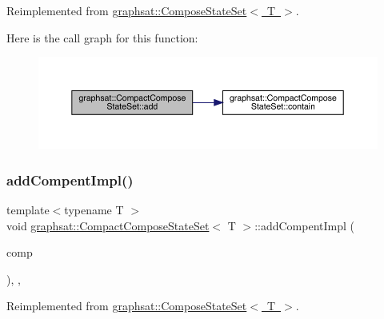 Reimplemented from \mbox{\hyperlink{classgraphsat_1_1_compose_state_set_a0f359257087c8ae10bf25881f9448395}{graphsat\+::\+Compose\+State\+Set$<$ T $>$}}.

Here is the call graph for this function\+:\nopagebreak
\begin{figure}[H]
\begin{center}
\leavevmode
\includegraphics[width=350pt]{classgraphsat_1_1_compact_compose_state_set_ad728351fbf1e81740088147289ef3884_cgraph}
\end{center}
\end{figure}
\mbox{\label{classgraphsat_1_1_compact_compose_state_set_a11bd85b646593e15141f597abbe301da}} 
\subsubsection{\texorpdfstring{addCompentImpl()}{addCompentImpl()}}
{\footnotesize\ttfamily template$<$typename T $>$ \\
void \mbox{\hyperlink{classgraphsat_1_1_compact_compose_state_set}{graphsat\+::\+Compact\+Compose\+State\+Set}}$<$ T $>$\+::add\+Compent\+Impl (\begin{DoxyParamCaption}\item[{\mbox{\hyperlink{classgraphsat_1_1_single_state_set}{Single\+State\+Set}}$<$ T $>$ \&}]{comp }\end{DoxyParamCaption})\hspace{0.3cm}{\ttfamily [inline]}, {\ttfamily [protected]}, {\ttfamily [virtual]}}



Reimplemented from \mbox{\hyperlink{classgraphsat_1_1_compose_state_set_a143dc652308b16919867155d59fa0a09}{graphsat\+::\+Compose\+State\+Set$<$ T $>$}}.

\mbox{\label{classgraphsat_1_1_compact_compose_state_set_a0a42f9a9d01b52368209db0e1c5e67b7}} 
